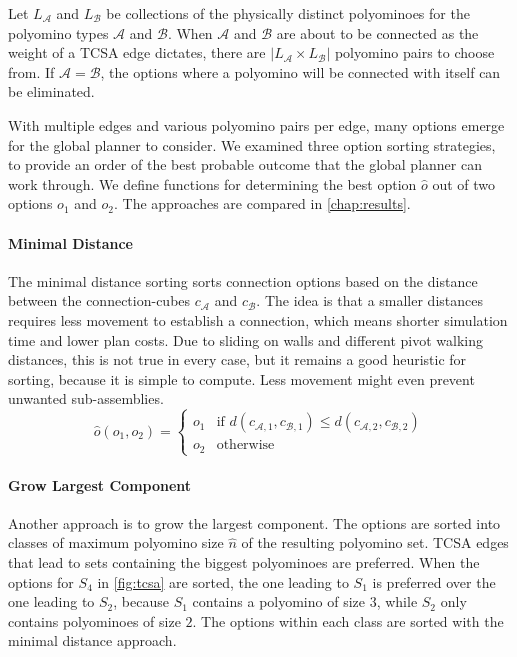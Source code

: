 Let $L_\mathcal{A}$ and $L_\mathcal{B}$ be collections of the physically distinct polyominoes for the polyomino types $\mathcal{A}$ and $\mathcal{B}$.
When $\mathcal{A}$ and $\mathcal{B}$ are about to be connected as the weight of a TCSA edge dictates, there are $\left| L_\mathcal{A} \times L_\mathcal{B} \right|$ polyomino pairs to choose from.
If $\mathcal{A} = \mathcal{B}$, the options where a polyomino will be connected with itself can be eliminated.

With multiple edges and various polyomino pairs per edge, many options emerge for the global planner to consider.
We examined three option sorting strategies, to provide an order of the best probable outcome that the global planner can work through. 
We define functions for determining the best option $\hat{o}$ out of two options $o_1$ and $o_2$.
The approaches are compared in \autoref{chap:results}.

\paragraph{Minimal Distance}

The minimal distance sorting sorts connection options based on the distance between the connection-cubes $c_\mathcal{A}$ and $c_\mathcal{B}$.
The idea is that a smaller distances requires less movement to establish a connection, which means shorter simulation time and lower plan costs.
Due to sliding on walls and different pivot walking distances, this is not true in every case, but it remains a good heuristic for sorting, because it is simple to compute.
Less movement might even prevent unwanted sub-assemblies.
\begin{equation}
\hat{o}(o_1, o_2) =
\begin{cases}
o_1 & \text{if } d(c_{\mathcal{A},1}, c_{\mathcal{B},1}) \leq d(c_{\mathcal{A},2}, c_{\mathcal{B},2}) \\
o_2 & \text{otherwise}
\end{cases}
\end{equation}

\paragraph{Grow Largest Component}

Another approach is to grow the largest component.
The options are sorted into classes of maximum polyomino size $\hat{n}$ of the resulting polyomino set.
TCSA edges that lead to sets containing the biggest polyominoes are preferred.
When the options for $S_4$ in \autoref{fig:tcsa} are sorted, the one leading to $S_1$ is preferred over the one leading to $S_2$, because $S_1$ contains a polyomino of size $3$, while $S_2$ only contains polyominoes of size $2$. 
The options within each class are sorted with the minimal distance approach.


